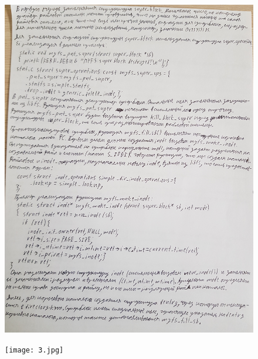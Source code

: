 \documentclass[a4paper,12pt]{article}
\begin{document}
	\begin{figure}[h!]
		\begin{center}
			{\includegraphics[scale = 0.9,  angle = 180]{2.jpg}}
			\label{2}
		\end{center}
	\end{figure}
	
	\newpage
	
	\begin{figure}[h!]
		\begin{center}
			{\texttt{[image: 3.jpg]}}
			\label{3}
		\end{center}
	\end{figure}
\end{document}

